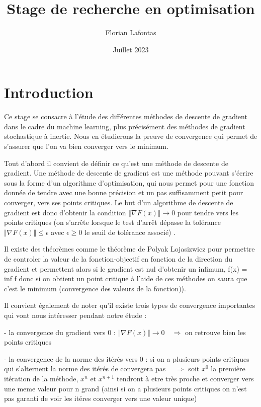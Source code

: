 \documentclass{article}
\title{Stage de recherche en optimisation}
\author{Florian Lafontas}
\date{Juillet 2023}
\begin{document}
\maketitle
\tableofcontents
\newpage
\section{Introduction}

Ce stage se consacre à l'étude des différentes méthodes de descente de gradient dans le cadre du machine learning, plus précisément des méthodes de gradient stochastique à inertie. Nous en étudierons la preuve de convergence qui permet de s'assurer que l'on va bien converger vers le minimum. 

\bigskip

Tout d'abord il convient de définir ce qu'est une méthode de descente de  gradient. Une méthode de descente de gradient est une méthode pouvant s'écrire sous la forme d'un algorithme d'optimisation, qui nous permet pour une fonction donnée de tendre avec une bonne précision et un pas suffisamment petit pour converger, vers ses points critiques.
Le but d'un algorithme de descente de gradient est donc d'obtenir la condition $ \Vert \nabla F(x)  \Vert \rightarrow 0$ pour tendre vers les points critiques (on s'arrête lorsque le test d'arrêt dépasse la tolérance $ \Vert \nabla F(x)  \Vert \leq \epsilon$ avec $\epsilon \geq 0$ le seuil de tolérance associé) .

\bigskip

Il existe des théorèmes comme le théorème de Polyak Lojasizwicz pour permettre de controler la valeur de la fonction-objectif en fonction de la direction du gradient et permettent alors si le gradient est nul d'obtenir un infimum, f(x) = inf f donc si on obtient un point critique à l'aide de ces méthodes on saura que c’est le minimum (convergence des valeurs de la fonction)).

\bigskip

Il convient également de noter qu'il existe trois types de convergence importantes qui vont nous intéresser pendant notre étude : 

- la convergence du gradient vers 0 :  $ \Vert \nabla F(x)  \Vert \rightarrow 0 \quad \Rightarrow $ on retrouve bien les points critiques

- la convergence de la norme des itérés vers 0 : si on a plusieurs points critiques qui s'alternent la norme des itérés de convergera pas $\quad \Rightarrow$ soit $x^0$ la première itération de la méthode, $x^n$ et $x^{n+1}$ tendront à etre très proche et converger vers une meme valeur pour n grand (ainsi si on a plusieurs points critiques on n'est pas garanti de voir les itéres converger vers une valeur unique)
\end{document}
